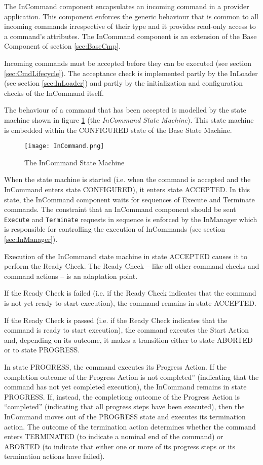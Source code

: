 The InCommand component encapsulates an incoming command in a provider application. This component enforces the generic behaviour that is common to all incoming commands irrespective of their type and it provides read-only access to a command's attributes. The InCommand component is an extension of the Base Component of section \ref{sec:BaseCmp}. 

Incoming commands must be accepted before they can be executed (see section \ref{sec:CmdLifecycle}). The acceptance check is implemented partly by the InLoader (see section \ref{sec:InLoader}) and partly by the initialization and configuration checks of the InCommand itself.

The behaviour of a command that has been accepted is modelled by the state machine shown in figure \ref{fig:InCommand} (the \textit{InCommand State Machine}). This state machine is embedded within the CONFIGURED state of the Base State Machine. 

\begin{figure}[h]
 \centering
 \texttt{[image: InCommand.png]}
 \caption{The InCommand State Machine}
 \label{fig:InCommand}
\end{figure}

When the state machine is started (i.e. when the command is accepted and the InCommand enters state CONFIGURED), it enters state ACCEPTED. In this state, the InCommand component waits for sequences of Execute and Terminate commands. The constraint that an InCommand component should be sent \texttt{Execute} and \texttt{Terminate} requests in sequence is enforced by the InManager which is responsible for controlling the execution of InCommands (see section \ref{sec:InManager}).

Execution of the InCommand state machine in state ACCEPTED causes it to perform the Ready Check. The Ready Check – like all other command checks and command actions – is an adaptation point.  

If the Ready Check is failed (i.e. if the Ready Check indicates that the command is not yet ready to start execution), the command remains in state ACCEPTED.

If the Ready Check is passed (i.e. if the Ready Check indicates that the command is ready to start execution), the command executes the Start Action and, depending on its outcome, it makes a transition either to state ABORTED or to state PROGRESS.  

In state PROGRESS, the command executes its Progress Action. If the completion outcome of the Progress Action is not completed” (indicating that the command has not yet completed execution), the InCommand remains in state PROGRESS. If, instead, the completiong outcome of the Progress Action is “completed” (indicating that all progress steps have been executed), then the InCommand moves out of the PROGRESS state and executes its termination action. The outcome of the termination action determines whether the command enters TERMINATED (to indicate a nominal end of the command) or ABORTED (to indicate that either one or more of its progress steps or its termination actions have failed).  

